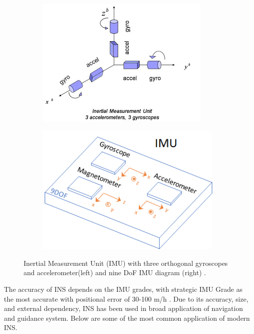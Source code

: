 \begin{figure}[ht]
\begin{center}
%    
  \begin{subfigure}[b]{0.4\textwidth}
    \includegraphics[scale=0.6]{Figures/imu_6dof.jpg}
  \end{subfigure}
  \begin{subfigure}[b]{0.4\textwidth}
    \includegraphics[scale=0.7]{Figures/imu_diagram.png}
  \end{subfigure}
% 
    \begin{center}
  \caption{Inertial Measurement Unit (IMU) with three orthogonal gyroscopes and accelerometer(left) \cite{Fig_5.jpg320240} and nine DoF IMU diagram (right) \cite{2021ModelSimulink}.}
    \label{fig:1}
    \end{center}
    
\end{center}
\end{figure}
\noindent The accuracy of INS depends on the IMU grades, with strategic IMU Grade as the most accurate with positional error of 30-100 m/h \cite{El-Sheimy2020InertialTrends}. Due to its accuracy, size, and external dependency, INS has been used in broad application of navigation and guidance system. Below are some of the most common application of modern INS.

